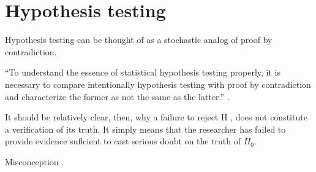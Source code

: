 \hypertarget{ch:hypothesis}{%
\chapter{Hypothesis testing}\label{ch:hypothesis}}

Hypothesis testing can be thought of as a stochastic analog of proof by
contradiction.

``To understand the essence of statistical hypothesis testing properly, it is
necessary to compare intentionally hypothesis testing with proof by
contradiction and characterize the former as not the same as the latter.''
\citep{otani2019comparing}.

It should be relatively clear, then, why a failure to reject H , does not
constitute a verification of its truth. It simply means that the researcher has
failed to provide evidence suflcient to cast serious doubt on the truth of
\(H_0\). \citep{reeves1980hypothesis}

Misconception \citep{falk1995significance}.

